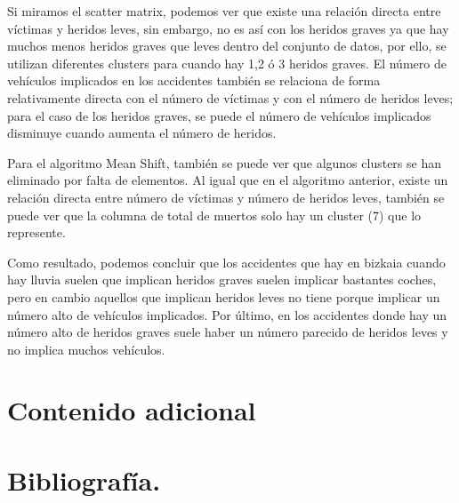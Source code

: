 	\vspace{0.06in}
	Si miramos el scatter matrix, podemos ver que existe una relación directa entre víctimas y heridos leves, sin embargo, no es así con los heridos graves ya que hay muchos menos heridos graves que leves dentro del conjunto de datos, por ello, se utilizan diferentes clusters para cuando hay 1,2 ó 3 heridos graves. El número de vehículos implicados en los accidentes también se relaciona de forma relativamente directa con el número de víctimas y con el número de heridos leves; para el caso de los heridos graves, se puede el número de vehículos implicados disminuye cuando aumenta el número de heridos.
	
	\vspace{0.06in}
	
	Para el algoritmo Mean Shift, también se puede ver que algunos clusters se han eliminado por falta de elementos. Al igual que en el algoritmo anterior, existe un relación directa entre número de víctimas y número de heridos leves, también se puede ver que la columna de total de muertos solo hay un cluster (7) que lo represente.
	
	\vspace{0.06in}
	Como resultado, podemos concluir que los accidentes que hay en bizkaia cuando hay lluvia suelen que implican heridos graves suelen implicar bastantes coches, pero en cambio aquellos que implican heridos leves no tiene porque implicar un número alto de vehículos implicados. Por último, en los accidentes donde hay un número alto de heridos graves suele haber un número parecido de heridos leves y no implica muchos vehículos.

	\section[Contenido adicional]{Contenido adicional}
	\section[Bibliografía]{Bibliografía.}


